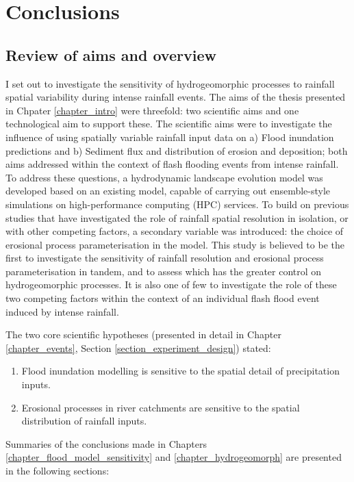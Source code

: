 \chapter{Conclusions}
\label{chapter_conclusion}

\section{Review of aims and overview}

I set out to investigate the sensitivity of hydrogeomorphic processes to rainfall spatial variability during intense rainfall events. The aims of the thesis presented in Chpater \ref{chapter_intro} were threefold: two scientific aims and one technological aim to support these. The scientific aims were to investigate the influence of using spatially variable rainfall input data on a) Flood inundation predictions and b) Sediment flux and distribution of erosion and deposition; both aims addressed within the context of flash flooding events from intense rainfall. To address these questions, a hydrodynamic landscape evolution model was developed based on an existing model, capable of carrying out ensemble-style simulations on high-performance computing (HPC) services. To build on previous studies that have investigated the role of rainfall spatial resolution in isolation, or with other competing factors, a secondary variable was introduced: the choice of erosional process parameterisation in the model. This study is believed to be the first to investigate the sensitivity of rainfall resolution and erosional process parameterisation in tandem, and to assess which has the greater control on hydrogeomorphic processes. It is also one of few to investigate the role of these two competing factors within the context of an individual flash flood event induced by intense rainfall. 

The two core scientific hypotheses (presented in detail in Chapter \ref{chapter_events}, Section \ref{section_experiment_design}) stated:

\begin{enumerate}
\item Flood inundation modelling is sensitive to the spatial detail of precipitation inputs.
\item Erosional processes in river catchments are sensitive to the spatial distribution of rainfall inputs.
\end{enumerate}

Summaries of the conclusions made in Chapters \ref{chapter_flood_model_sensitivity} and \ref{chapter_hydrogeomorph} are presented in the following sections:

